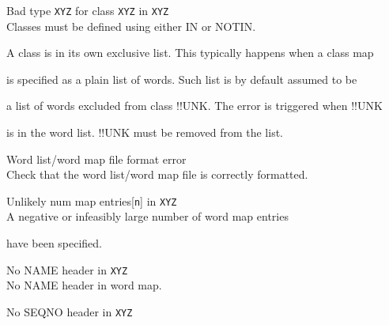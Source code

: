 \begin{itemize}
\begin{itemize}
 Bad type \texttt{XYZ} for class \texttt{XYZ} in \texttt{XYZ}\\


        Classes must be defined using either IN or NOTIN.





 A class is in its own exclusive list. This typically happens when a class map 


              is specified as a plain list of words. Such list is by default assumed to be 


              a list of words excluded from class !!UNK. The error is triggered when !!UNK


              is in the word list. !!UNK must be removed from the list.





\end{itemize}















\begin{itemize}


   Word list/word map file format error\\


        Check that the word list/word map file is correctly formatted.





  Unlikely num map entries[\texttt{n}] in \texttt{XYZ}\\


        A negative or infeasibly large number of word map entries


        have been specified.





 No NAME header in \texttt{XYZ}\\


        No NAME header in word map.





 No SEQNO header in \texttt{XYZ}\\



\end{itemize}
\end{itemize}

